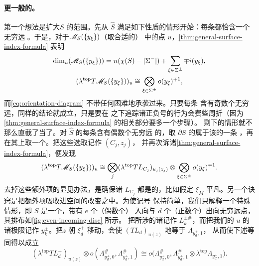 \paragraph{更一般的\trRiemann\trSurface。}\label{sub:general-riemann-surfaces}
第一个想法是扩大\trRiemann\trSurface{}$S$ 的范围。先从\trCompactification{}
$\hat{S}$ 满足如下性质的情形开始：每条\trBoundaryCircle{}都恰含一个无穷远%
\trIncomingPoint。于是，对于\trModuliSpace{}$\mathscr{M}_S(\{y_\xi\})$（取合适的）
中\trRegular{}的点 $u$，\cref{thm:general-surface-index-formula} 表明
\begin{equation*}
\begin{gathered}
\dim_u(\mathscr{M}_S(\{y_\xi\}))=n(\chi(S)-|\Sigma^-|)
+\sum_{\xi\in\Sigma^{\pm}}\mp i(y_\xi),\\
(\lambda^{\mathrm{top}}T\mathscr{M}_S(\{y_\xi\}))_u
\cong\bigotimes_{\xi\in\Sigma^{\pm}}o(y_\xi)^{\mp 1},
\end{gathered}
\end{equation*}
而\eqref{eq:orientation-diagram} 不带任何困难地承袭过来。只要每条%
\trBoundaryCircle{}含有奇数个无穷远\trIncomingPoint，同样的结论就成立，只是要在%
\trGluing{}之下追踪诸正负号的行为会费些周折（因为\cref{thm:general-surface-index-formula}
的相关部分要多一个步骤）。
剩下的情形就不那么直截了当了。对 $\hat{S}$ 的每条含有偶数个无穷远%
\trIncomingPoint{}的\trBoundaryCircle，取 $\partial S$ 的属于该\trCircle{}的一条%
\trBoundaryComponent，再在其上取一个\trMarkedPoint。把这些选取记作 $(C_j,z_j)$，
并再次诉诸\cref{thm:general-surface-index-formula}，便发现
\begin{equation}\label{eq:extra-tangent-factors}
(\lambda^{\mathrm{top}}T\mathscr{M}_S(\{y_\xi\}))_u
\cong\bigotimes_j(\lambda^{\mathrm{top}}TL_{C_j})_{u_j(z_j)}
\otimes\bigotimes_{\xi\in\Sigma^{\pm}}o(y_\xi)^{\mp 1}.
\end{equation}
去掉这些额外项的显见办法，是确保诸 $L_{C_j}$ 都是\trOrientation{}的，比如假定
$\xi_M$ 平凡。另一个诀窍是把额外项吸收进\trOrientation{}空间的改变之中。为使记号
保持简单，我们只解释一个特殊情形，即 $S$ 是一个\trDisk{}，带有 $e$ 个（偶数个）
入向与 $d$ 个（正数个）出向无穷远点，其排布如\cref{fig:even-incoming-disc} 所示。
把所涉的诸\trLagrange\trBrane{}记作 $L^{\pm\#}_k$，而把我们的%
\trPseudoholomorphicMap{}$u$ 的诸极限记作 $y^{\pm}_k$。把\trMarkedPoint{}$z$ 朝
$\xi^+_d$ 移动，会使 $(TL_d)_{u(z)}$ \trAsymptotic{}地等于 $\Lambda_{y^+_d,1}$，
从而使下述等同得以成立
\begin{equation}\label{eq:asymptotic-identification}
(\lambda^{\mathrm{top}}TL^+_d)_{u(z)}
\otimes o(\Lambda^{\#}_{y^+_d,0},\Lambda^{\#}_{y^+_d,1})
\cong o\bigl(\Lambda^{\#}_{y^+_d,0},
\Lambda^{\#}_{y^+_d,1}\otimes\lambda^{\mathrm{top}}\Lambda_{y^+_d,1}\bigr).
\end{equation}
